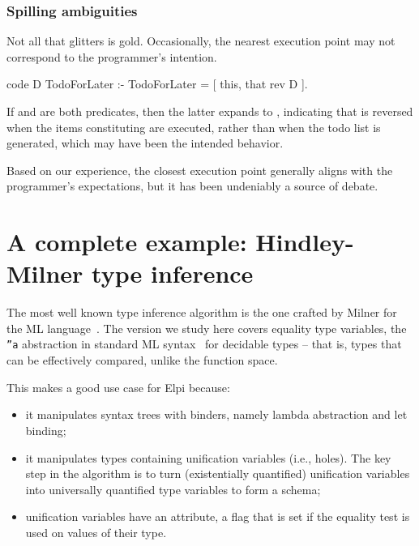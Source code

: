 \documentclass{these-ISSS}
\newenvironment{elpicode}
  {\VerbatimEnvironment\begin{elpibox}\begin{xelpicode}}{\end{xelpicode}
\end{elpibox}}
\begin{document}
\subsubsection{Spilling ambiguities}

Not all that glitters is gold. Occasionally, the nearest execution point may not
correspond to the programmer's intention.

\begin{elpicode}
  code D TodoForLater  :-
    TodoForLater = [ this, that {rev D} ].
\end{elpicode}

If  and  are both predicates, then the latter expands to
, indicating that  is reversed when
the items constituting  are executed, rather than when
the todo list is generated, which may have been the intended behavior.

Based on our experience, the closest execution point generally aligns with
the programmer's expectations, but it has been undeniably a source of debate.

\newpage
\section{A complete example: Hindley-Milner type inference}\label{sec:milner}

The most well known type inference algorithm is the one crafted by Milner
for the ML language~\cite{MILNER1978348}. The version we study here covers
equality type variables, the \texttt{''a} abstraction in standard ML syntax~\cite{10.7551/mitpress/2319.001.0001}
for decidable types -- that is, types that can be effectively compared, unlike
the function space.

This makes a good use case for Elpi because:
\begin{itemize}
  \item it manipulates syntax trees with binders, namely lambda abstraction
    and let binding;
  \item it manipulates types containing unification variables (i.e., holes).
    The key step in the algorithm is to turn (existentially quantified)
    unification variables into universally quantified type variables to form a
    schema;
  \item unification variables have an attribute, a flag
    that is set if the equality test is used on values of their type.
\end{itemize}
\end{document}
